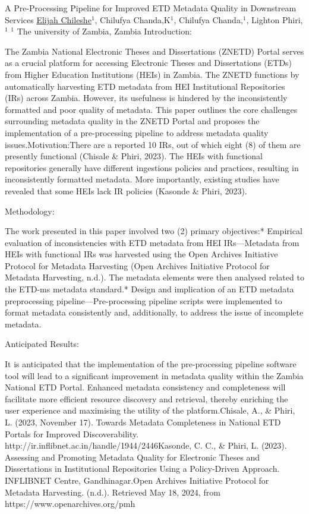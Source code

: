 
    \begin{abstract_online}{A Pre-Processing Pipeline for Improved ETD Metadata Quality in Downstream Services}{%
        \underline{Elijah Chileshe}$^{1}$, Chilufya Chanda,K$^{1}$, Chilufya Chanda,$^{1}$, Lighton Phiri,$^{1}$}{%
        }{%
        $^1$ The university of Zambia, Zambia\newline{}
            }
	Introduction:
	
	The Zambia National Electronic Theses and Dissertations (ZNETD) Portal serves as a crucial platform for accessing Electronic Theses and Dissertations (ETDs) from Higher Education Institutions (HEIs) in Zambia. The ZNETD functions by automatically harvesting ETD metadata from HEI Institutional Repositories (IRs) across Zambia. However, its usefulness is hindered by the inconsistently formatted and poor quality of metadata. This paper outlines the core challenges surrounding metadata quality in the ZNETD Portal and proposes the implementation of a pre-processing pipeline to address metadata quality issues.Motivation:There are a reported 10 IRs, out of which eight (8) of them are presently functional (Chisale & Phiri, 2023). The HEIs with functional repositories generally have different ingestions policies and practices, resulting in inconsistently formatted metadata. More importantly, existing studies have revealed that some HEIs lack IR policies (Kasonde & Phiri, 2023).
	
	Methodology:
	
	The work presented in this paper involved two (2) primary objectives:* Empirical evaluation of inconsistencies with ETD metadata from HEI IRs—Metadata from HEIs with functional IRs was harvested using the Open Archives Initiative Protocol for Metadata Harvesting (Open Archives Initiative Protocol for Metadata Harvesting, n.d.). The metadata elements were then analysed related to the ETD-ms metadata standard.* Design and implication of an ETD metadata preprocessing pipeline—Pre-processing pipeline scripts were implemented to format metadata consistently and, additionally, to address the issue of incomplete metadata.
	
	Anticipated Results:
	
	It is anticipated that the implementation of the pre-processing pipeline software tool will lead to a significant improvement in metadata quality within the Zambia National ETD Portal. Enhanced metadata consistency and completeness will facilitate more efficient resource discovery and retrieval, thereby enriching the user experience and maximising the utility of the platform.Chisale, A., & Phiri, L. (2023, November 17). Towards Metadata Completeness in National ETD Portals for Improved Discoverability. http://ir.inflibnet.ac.in/handle/1944/2446Kasonde, C. C., & Phiri, L. (2023). Assessing and Promoting Metadata Quality for Electronic Theses and Dissertations in Institutional Repositories Using a Policy-Driven Approach. INFLIBNET Centre, Gandhinagar.Open Archives Initiative Protocol for Metadata Harvesting. (n.d.). Retrieved May 18, 2024, from https://www.openarchives.org/pmh
    \end{abstract_online}
    
